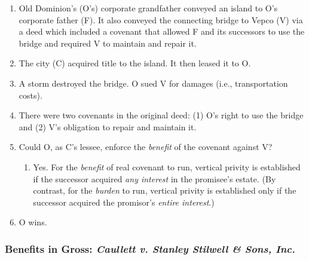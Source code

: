\begin{enumerate}
    \item Old Dominion's (O's) corporate grandfather conveyed an island to O's 
    corporate father (F). It also conveyed the connecting bridge to Vepco (V) 
    via a deed which included a covenant that allowed F and its successors to 
    use the bridge and required V to maintain and repair it.
    \item The city (C) acquired title to the island. It then leased it to O.
    \item A storm destroyed the bridge. O sued V for damages (i.e., 
    transportation costs).
    \item There were two covenants in the original deed: (1) O's right to use 
    the bridge and (2) V's obligation to repair and maintain it.
    \item Could O, as C's lessee, enforce the \emph{benefit} of the covenant 
    against V?
    \begin{enumerate}
        \item Yes. For the \emph{benefit} of real covenant to run, vertical 
        privity is established if the successor acquired \emph{any interest} 
        in the promisee's estate. (By contrast, for the \emph{burden} to run, 
        vertical privity is established only if the successor acquired the 
        promisor's \emph{entire interest}.)
    \end{enumerate}
    \item O wins.
\end{enumerate}

\subsubsection{Benefits in Gross: \emph{Caullett v. Stanley Stilwell \& Sons, 
Inc.}}

